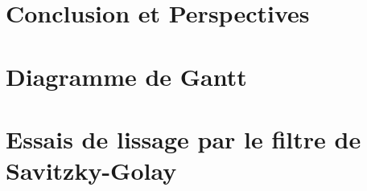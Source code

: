 \documentclass[a4paper,12pt,twoside,chapterprefix=true]{scrbook}
\begin{document}
  
  
  \chapter{Conclusion et Perspectives}
  
  
  
\appendix

\chapter{Diagramme de Gantt}\label{annexe-a}
\chapter{Essais de lissage par le filtre de Savitzky-Golay}\label{annexe-b}

\backmatter

\printglossary[type=\acronymtype]

\cleardoublepage
{}


  
\end{document}
